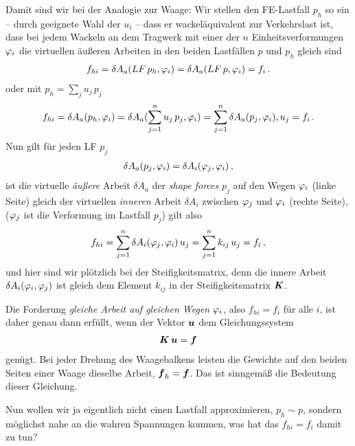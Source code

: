 Damit sind wir bei der  Analogie zur Waage: Wir stellen den FE-Lastfall $p_h $ so ein -- durch geeignete Wahl der $u_i$ -- dass er \glq wackel\"{a}quivalent\grq{} zur Verkehrslast ist, dass bei jedem Wackeln an dem Tragwerk mit einer der $n$ Einheitsverformungen $\varphi_i$ die virtuellen \"{a}u{\ss}eren Arbeiten in den beiden Lastf\"{a}llen $p$ und $p_h$ gleich sind
\begin{align}
f_{hi} =\delta A_a(LF\,p_h,\varphi_i) = \delta A_a(LF\,p,\varphi_i) = f_i\,.
\end{align}
oder mit $p_h = \sum_j u_j\,p_j$
\begin{align}
f_{hi} =\delta A_a(p_h,\varphi_i) = \delta A_a(\sum_{j = 1}^n u_j\,p_j,\varphi_i) = \sum_{j = 1}^n \delta A_a(p_j,\varphi_i),u_j = f_i\,.
\end{align}
Nun gilt f\"{u}r jeden LF $p_j$
\begin{align}
\delta A_a(p_j, \varphi_i) = \delta A_i(\varphi_j,\varphi_i)\,,
\end{align}
 ist die virtuelle {\em \"{a}u{\ss}ere\/} Arbeit $\delta A_a$ der {\em shape forces\/} $p_j$ auf den Wegen $\varphi_i$ (linke Seite) gleich der  virtuellen {\em inneren\/} Arbeit $\delta A_i$ zwischen $\varphi_j$ und $\varphi_i$ (rechte Seite), ($\varphi_j$ ist die Verformung im Lastfall $p_j$) gilt also
\begin{align}
f_{hi} =\sum_{j = 1}^n \delta A_i(\varphi_j,\varphi_i)\,u_j = \sum_{j = 1}^n k_{ij}\,u_j = f_i\,,
\end{align}
und hier sind wir pl\"{o}tzlich bei der Steifigkeitsmatrix, denn die innere Arbeit $\delta A_i(\varphi_i,\varphi_j)$
ist gleich dem Element $k_{ij} $ in der Steifigkeitsmatrix $\mbox{\boldmath $K$} $.

Die Forderung {\em gleiche Arbeit auf gleichen Wegen\/} $\varphi_i$, also $f_{hi} = f_i$ f\"{u}r alle $i$, ist daher genau dann erf\"{u}llt, wenn der Vektor $\mbox{\boldmath $u$} $ dem Gleichungssystem
\begin{align}
\mbox{\boldmath $K$}\,\mbox{\boldmath $u$} = \mbox{\boldmath $f$}
\end{align}
gen\"{u}gt. Bei jeder Drehung des Waagebalkens leisten die Gewichte auf den beiden Seiten einer Waage dieselbe Arbeit, $\mbox{\boldmath $f$}_h = \mbox{\boldmath $f$}$. Das ist sinngem\"{a}{\ss} die Bedeutung dieser Gleichung.

Nun wollen wir ja eigentlich nicht einen Lastfall approximieren, $p_h \sim p$, sondern m\"{o}glichst nahe an die wahren Spannungen kommen, was hat das $f_{hi} = f_i $ damit zu tun?

